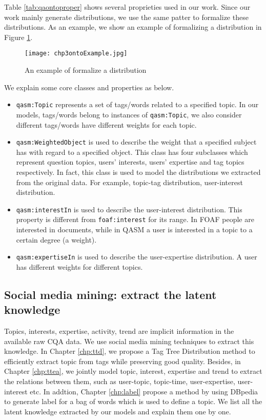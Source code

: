 Table \ref{tab:qaontoproper} shows several proprieties used in our work. Since our work mainly generate distributions, we use the same patter to formalize these distributions. As an example, we show an example of formalizing a distribution in Figure \ref{fig:chp3ontoexample}. 

\begin{figure}%
\centering
\texttt{[image: chp3ontoExample.jpg]}  
\caption{An example of formalize a distribution}
\label{fig:chp3ontoexample} 
\end{figure}

We explain some core classes and properties as below.

\begin{itemize}
\item \texttt{qasm:Topic} represents a set of tags/words related to a specified topic.
In our models, tags/words belong to instances of \texttt{qasm:Topic}, we also consider different tags/words have different weights for each topic.
\item \texttt{qasm:WeightedObject} is used to describe the weight that a specified subject has with regard to a specified object. This class has four subclasses which represent question topics, users' interests, users' expertise and tag topics respectively. In fact, this class is used to model the distributions we extracted from the original data. For example, topic-tag distribution, user-interest distribution.
\item \texttt{qasm:interestIn} is used to describe the user-interest distribution. This property is different from \texttt{foaf:interest} for its range. In FOAF people are interested in documents, while in QASM a user is interested in a topic to a certain degree (a weight).
\item \texttt{qasm:expertiseIn} is used to describe the user-expertise distribution. A user has different weights for different topics.
\end{itemize}


\subsection{Social media mining: extract the latent knowledge}

Topics, interests, expertise, activity, trend are implicit information in the available raw CQA data. We use social media mining techniques to extract this knowledge.
In Chapter \ref{chp:ttd}, we propose a Tag Tree Distribution method to efficiently extract topic from tags while preserving good quality. Besides, in Chapter \ref{chp:ttea}, we jointly model topic, interest, expertise and trend to extract the relations between them, such as user-topic, topic-time, user-expertise, user-interest etc. In addtion, Chapter \ref{chp:label} propose a method by using DBpedia to generate label for a bag of words which is used to define a topic. 
We list all the latent knowledge extracted by our models and explain them one by one.




